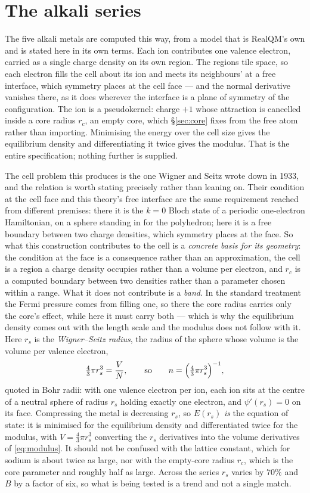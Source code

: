 \documentclass[11pt]{article}
\begin{document}
\section{The alkali series}\label{sec:alkalis}

The five alkali metals are computed this way, from a model that is RealQM's own and is stated here in
its own terms. Each ion contributes one valence electron, carried as a single charge density on its
own region. The regions tile space, so each electron fills the cell about its ion and meets its
neighbours' at a free interface, which symmetry places at the cell face --- and the normal derivative
vanishes there, as it does wherever the interface is a plane of symmetry of the configuration. The ion is a pseudokernel: charge
$+1$ whose attraction is cancelled inside a core radius $r_c$, an empty core, which
\S\ref{sec:core} fixes from the free atom rather than importing. Minimising the energy over the cell
size gives the equilibrium density and differentiating it twice gives the modulus. That is the entire
specification; nothing further is supplied.

The cell problem this produces is the one Wigner and Seitz wrote down in 1933, and the relation is
worth stating precisely rather than leaning on. Their condition at the cell face and this theory's
free interface are the same requirement reached from different premises: there it is the $k=0$ Bloch
state of a periodic one-electron Hamiltonian, on a sphere standing in for the polyhedron; here it is
a free boundary between two charge densities, which symmetry places at the face. So what this
construction contributes to the cell is a \emph{concrete basis for its geometry}: the condition at
the face is a consequence rather than an approximation, the cell is a region a charge density
occupies rather than a volume per electron, and $r_c$ is a computed boundary between two densities
rather than a parameter chosen within a range. What it does not contribute is a \emph{band}. In the
standard treatment the Fermi pressure comes from filling one, so there the core radius carries only
the core's effect, while here it must carry both --- which is why the equilibrium density comes out
with the length scale and the modulus does not follow with it. Here $r_s$ is the
\emph{Wigner--Seitz radius}, the radius of
the sphere whose volume is the volume per valence electron,
\[
\tfrac{4}{3}\pi r_s^3=\frac{V}{N},\qquad\text{so}\qquad n=\Bigl(\tfrac{4}{3}\pi r_s^3\Bigr)^{-1},
\]
quoted in Bohr radii: with one valence electron per ion, each ion sits at the centre of a neutral
sphere of radius $r_s$ holding exactly one electron, and $\psi'(r_s)=0$ on its face. Compressing the metal is decreasing
$r_s$, so $E(r_s)$ \emph{is} the equation of state: it is minimised for the equilibrium density and
differentiated twice for the modulus, with $V=\tfrac43\pi r_s^3$ converting the $r_s$ derivatives
into the volume derivatives of \eqref{eq:modulus}. It should not be confused with the lattice
constant, which for sodium is about twice as large, nor with the empty-core radius $r_c$, which is
the core parameter and roughly half as large. Across the series $r_s$ varies by $70\%$ and $B$ by a
factor of six, so what is being tested is a trend and not a single match.
\end{document}
